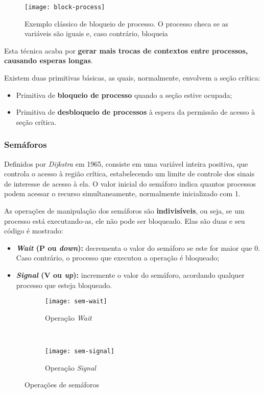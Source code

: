 \begin{figure}[ht]
  \centering
  \texttt{[image: block-process]}
  \caption{Exemplo clássico de bloqueio de processo. O processo checa se as variáveis são iguais e, caso contrário, bloqueia}
  \label{fig:block-process}
\end{figure}

Esta técnica acaba por \textbf{gerar mais trocas de contextos entre processos, causando esperas longas}.

Existem duas primitivas básicas, as quais, normalmente, envolvem a seção crítica:

\begin{itemize}
  \item Primitiva de \textbf{bloqueio de processo} quando a seção estive ocupada;

  \item Primitiva de \textbf{desbloqueio de processos} à espera da permissão de acesso à seção crítica.
\end{itemize}





\subsubsection{Semáforos}
Definidos por \textit{Dijkstra} em 1965, consiste em uma variável inteira positiva, que controla o acesso à região crítica, estabelecendo um limite de controle dos sinais de interesse de acesso à ela. O valor inicial do semáforo indica quantos processos podem acessar o recurso simultaneamente, normalmente inicializado com 1.

As operações de manipulação dos semáforos são \textbf{indivisíveis}, ou seja, se um processo está executando-as, ele não pode ser bloqueado. Elas são duas e seu código é mostrado:

\begin{itemize}
  \item \textbf{\textit{Wait} (P ou \textit{down}):} decrementa o valor do semáforo se este for maior que 0. Caso contrário, o processo que executou a operação é bloqueado;

  \item \textbf{\textit{Signal} (V ou \textit{up}):} incremente o valor do semáforo, acordando qualquer processo que esteja bloqueado.
\end{itemize}

\begin{figure*}[ht]

  \begin{subfigure}[t]{.5\textwidth}
    \centering
    \texttt{[image: sem-wait]}
    \caption{Operação \textit{Wait}}
    \label{subfig:sem-wait}
  \end{subfigure}
  ~
  \begin{subfigure}[t]{.5\textwidth}
    \centering
    \texttt{[image: sem-signal]}
    \caption{Operação \textit{Signal}}
    \label{subfig:sem-signal}
  \end{subfigure}

  \caption{Operações de semáforos}
  \label{fig:sem-ops}
\end{figure*}

